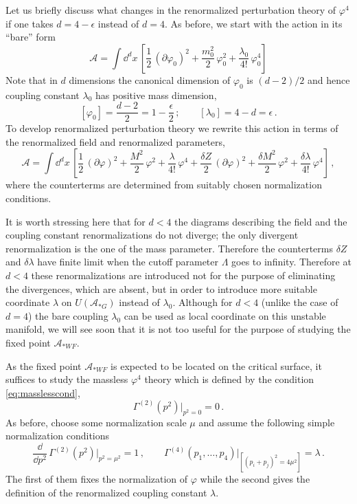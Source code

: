 Let us briefly discuss what changes in the renormalized perturbation theory of
$\varphi^4$ if one takes $d=4-\epsilon$ instead of $d=4$. As before, we start with
the action in its ``bare'' form
\[
\mathcal A=\int \dd^dx\,\left[\frac12\,(\partial\varphi_0)^2+\frac{m_0^2}2\,\varphi_0^2+\frac{\lambda_0}{4!}\,\varphi_0^4\right]
\]
Note that in $d$ dimensions the canonical dimension of $\varphi_0$ is $(d-2)/2$
and hence coupling constant $\lambda_0$ has positive mass dimension,
\[
[\varphi_0]=\frac{d-2}2=1-\frac\epsilon2\,;\qquad[\lambda_0]=4-d=\epsilon\,.
\]
To develop renormalized perturbation theory we rewrite this action in terms of the
renormalized field and renormalized parameters,
\begin{equation}\label{eq:Aren21}
\mathcal A=\int \dd^dx\,\left[\frac12\,(\partial\varphi)^2+\frac{M^2}2\,\varphi^2+\frac\lambda{4!}\,\varphi^4
+\frac{\delta Z}2\,(\partial\varphi)^2+\frac{\delta M^2}2\,\varphi^2+\frac{\delta\lambda}{4!}\,\varphi^4\right]\,,
\end{equation}
where the counterterms are determined from suitably chosen normalization
conditions.

It is worth stressing here that for $d<4$ the diagrams describing the field and
the coupling constant renormalizations do not diverge; the only divergent
renormalization is the one of the mass parameter. Therefore the counterterms
$\delta Z$ and $\delta\lambda$ have finite limit when the cutoff parameter
$\Lambda$ goes to infinity. Therefore at $d<4$ these renormalizations are
introduced not for the purpose of eliminating the divergences, which are absent,
but in order to introduce more suitable coordinate $\lambda$ on
$U(\mathcal A_{*G})$ instead of $\lambda_0$. Although for $d<4$ (unlike the case
of $d=4$) the bare coupling $\lambda_0$ can be used as local coordinate on this
unstable manifold, we will see soon that it is not too useful for the purpose of
studying the fixed point $\mathcal A_{*WF}$.

As the fixed point $\mathcal A_{*WF}$ is expected to be located on the critical
surface, it suffices to study the massless $\varphi^4$ theory which is defined by
the condition \eqref{eq:masslesscond},
\[
\Gamma^{(2)}(p^2)\big|_{p^2=0}=0\,.
\]
As before, choose some normalization scale $\mu$ and assume the following simple
normalization conditions
\begin{equation}\label{eq:norm21}
\frac{\dd}{\dd p^2}\,\Gamma^{(2)}(p^2)\Big|_{p^2=\mu^2}=1\,,\qquad
\Gamma^{(4)}(p_1,\dots,p_4)\Big|_{[(p_i+p_j)^2=4\mu^2]}=\lambda\,.
\end{equation}
The first of them fixes the normalization of $\varphi$ while the second gives the
definition of the renormalized coupling constant $\lambda$.

